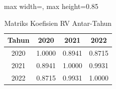 \begin{table}[H]
\centering
\caption{Matriks Koefisien RV Antar-Tahun} \label{tab:rv}
\begin{adjustbox}{max width=\textwidth, max height=0.85\textheight}
\begin{tabular}{|c|c|c|c|}
\hline
\textbf{Tahun} & \textbf{2020} & \textbf{2021} & \textbf{2022} \\
\hline
2020 & 1.0000 & 0.8941 & 0.8715 \\
2021 & 0.8941 & 1.0000 & 0.9931 \\
2022 & 0.8715 & 0.9931 & 1.0000 \\
\hline
\end{tabular}
\end{adjustbox}
\end{table}